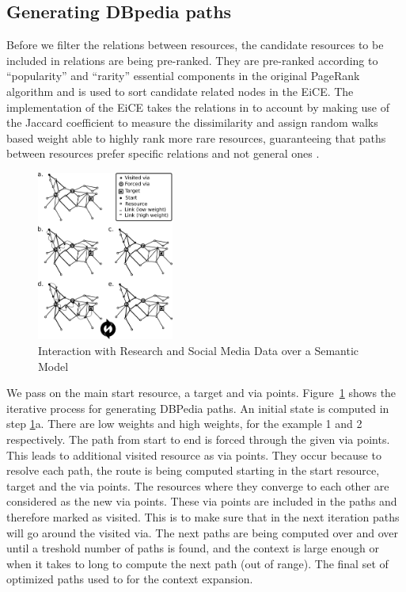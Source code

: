 \documentclass{acm_proc_article-sp}
\begin{document}
\subsection{Generating DBpedia paths}

Before we filter the relations between resources, the candidate resources to be included in relations are being pre-ranked. They are pre-ranked according to ``popularity'' and ``rarity'' essential components in the original PageRank algorithm \cite{page1999pagerank} and is used to sort candidate related nodes in the EiCE. The implementation of the EiCE takes the relations in to account by making use of the Jaccard coefficient to measure the dissimilarity and assign random walks based weight able to highly rank more rare resources, guaranteeing that paths between resources prefer specific relations and not general ones \cite{moore2012novel}.

\begin{figure}[h!]
\centering
\includegraphics[width=0.4\textwidth]{graphmultipatternmatching.png}
\caption{Interaction with Research and Social Media Data over a Semantic Model}
\label{fig:patternmatching}
\end{figure}

We pass on the main start resource, a target and via points. Figure~\ref{fig:patternmatching} shows the iterative process for generating DBPedia paths. An initial state is computed in step \ref{fig:patternmatching}a. There are low weights and high weights, for the example 1 and 2 respectively. The path from start to end is forced through the given via points. This leads to additional visited resource as via points. They occur because to resolve each path, the route is being computed starting in the start resource, target and the via points. The resources where they converge to each other are considered as the new via points. These via points are included in the paths and therefore marked as visited. This is to make sure that in the next iteration paths will go around the visited via. The next paths are being computed over and over until a treshold number of paths is found, and the context is large enough or when it takes to long to compute the next path (out of range). The final set of optimized paths used to for the context expansion.
\end{document}
